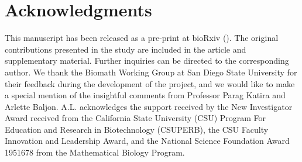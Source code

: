 \documentclass[aps,prl,preprint,superscriptaddress,showkeys,linenumbers]{revtex4-1}
\begin{document}
\section*{Acknowledgments}
This manuscript has been released as a pre-print at bioRxiv (\cite{Cobarrubia2020bioRxiv}).
The original contributions presented in the study are included in the article and supplementary material. Further inquiries can be directed to the corresponding author.
We thank the Biomath Working Group at San Diego State University for their feedback during the development of the project, and we would like to make a special mention of the insightful comments from Professor Parag Katira and Arlette Baljon.
A.L. acknowledges the support received by the New Investigator Award received from the California State University (CSU) Program For Education and Research in Biotechnology (CSUPERB), the CSU Faculty Innovation and Leadership Award, and the National Science Foundation Award 1951678 from the Mathematical Biology Program. 


%



\clearpage


\end{document}

